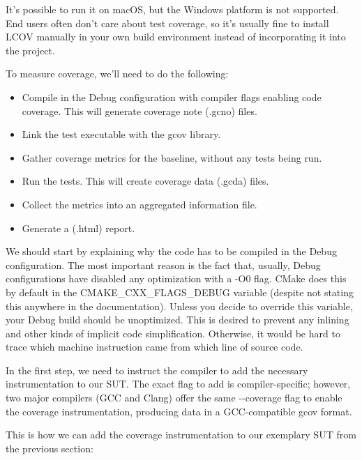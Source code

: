 It’s possible to run it on macOS, but the Windows platform is not supported. End users often don’t care about test coverage, so it’s usually fine to install LCOV manually in your own build environment instead of incorporating it into the project.

To measure coverage, we’ll need to do the following:

\begin{itemize}
\item
Compile in the Debug configuration with compiler flags enabling code coverage. This will generate coverage note (.gcno) files.

\item
Link the test executable with the gcov library.

\item
Gather coverage metrics for the baseline, without any tests being run.

\item
Run the tests. This will create coverage data (.gcda) files.

\item
Collect the metrics into an aggregated information file.

\item
Generate a (.html) report.
\end{itemize}

We should start by explaining why the code has to be compiled in the Debug configuration. The most important reason is the fact that, usually, Debug configurations have disabled any optimization with a -O0 flag. CMake does this by default in the CMAKE\_CXX\_FLAGS\_DEBUG variable (despite not stating this anywhere in the documentation). Unless you decide to override this variable, your Debug build should be unoptimized. This is desired to prevent any inlining and other kinds of implicit code simplification. Otherwise, it would be hard to trace which machine instruction came from which line of source code.

In the first step, we need to instruct the compiler to add the necessary instrumentation to our SUT. The exact flag to add is compiler-specific; however, two major compilers (GCC and Clang) offer the same -{}-coverage flag to enable the coverage instrumentation, producing data in a GCC-compatible gcov format.

This is how we can add the coverage instrumentation to our exemplary SUT from the previous section:


